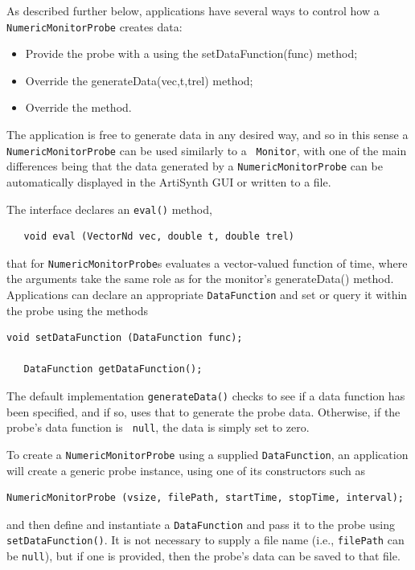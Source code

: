 As described further below, applications have several ways to control
how a {\tt NumericMonitorProbe} creates data:

\begin{itemize}

\item Provide the probe with a
 using the
%
{setDataFunction(func)} method;

\item Override the %
{generateData(vec,t,trel)}
method;

\item Override the 
method.

\end{itemize}

The application is free to generate data in any desired way, and so in
this sense a {\tt NumericMonitorProbe} can be used similarly to a {\tt
Monitor}, with one of the main differences being that the data
generated by a {\tt NumericMonitorProbe} can be automatically displayed
in the ArtiSynth GUI or written to a file.

The  interface
declares an {\tt eval()} method,
%
\begin{verbatim}
   void eval (VectorNd vec, double t, double trel)
\end{verbatim}
%
that for 
{\tt NumericMonitorProbe}s
evaluates a vector-valued function of time,
where the arguments take the same role as for the monitor's %
{generateData()}
method. Applications can declare an appropriate {\tt DataFunction} and
set or query it within the probe using the methods
\begin{lstlisting}[]
   void setDataFunction (DataFunction func);

   DataFunction getDataFunction();
\end{lstlisting}
%
The default implementation {\tt generateData()} checks to see
if a data function has been specified, and if so, uses that to
generate the probe data. Otherwise, if the probe's data function is {\tt
null}, the data is simply set to zero.

To create a {\tt NumericMonitorProbe} using a supplied {\tt DataFunction},
an application will create a generic probe instance, using one
of its constructors such as 
%
\begin{lstlisting}[]
   NumericMonitorProbe (vsize, filePath, startTime, stopTime, interval);
\end{lstlisting}
%
and then define and instantiate a {\tt DataFunction} and pass it to
the probe using {\tt setDataFunction()}. It is not necessary to supply
a file name (i.e., {\tt filePath} can be {\tt null}), but if one is
provided, then the probe's data can be saved to that file.

